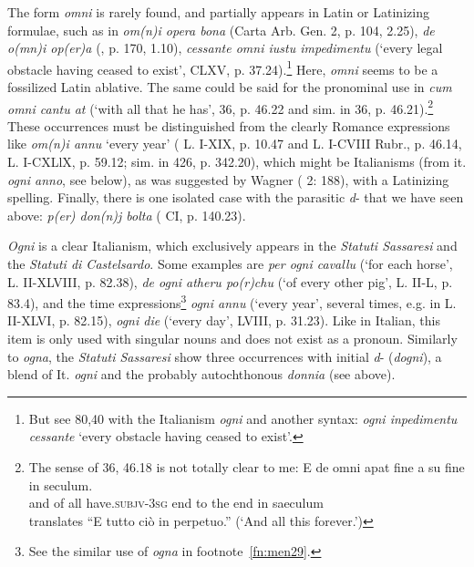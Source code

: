\documentclass[output=paper,colorlinks,citecolor=brown]{langscibook}
\begin{document}
The form \textit{omni} is rarely found, and partially appears in Latin or Latinizing formulae, such as in \textit{om(n)i opera bona} (Carta Arb. Gen. 2, p. 104, 2.25), \textit{de o(mn)i op(er)a} (, p. 170, 1.10), \textit{cessante omni iustu impedimentu} (‘every legal obstacle having ceased to exist’,  CLXV, p. 37.24).\footnote{But see  80,40 with the Italianism \textit{ogni} and another syntax: \textit{ogni inpedimentu cessante} ‘every obstacle having ceased to exist’.} Here, \textit{omni} seems to be a fossilized Latin ablative. The same could be said for the pronominal use in \textit{cum omni cantu at} (‘with all that he has’,   36, p. 46.22 and sim. in  36, p. 46.21).\footnote{The sense of  36, 46.18 is not totally clear to me:
\ea
    \gll E de omni apat fine a su fine in seculum.\\
    and	of	all	have.\textsc{subjv-3sg} end	to	the	end	in saeculum\\\z
\citet[][113]{Virdis2003} translates “E tutto ciò in perpetuo.” (‘And all this forever.’)} These occurrences must be distinguished from the clearly Romance expressions like \textit{om(n)i annu} ‘every year’ ( L. I-XIX, p. 10.47 and   L. I-CVIII Rubr., p. 46.14,  L. I-CXLlX, p. 59.12; sim. in  426, p. 342.20), which might be Italianisms (from it. \textit{ogni anno}, see below), as was suggested by Wagner ( 2: 188), with a Latinizing spelling. Finally, there is one isolated case with the parasitic \textit{d}- that we have seen above: \textit{p(er) don(n)j bolta} ( CI, p. 140.23).

\textit{Ogni} is a clear Italianism, which exclusively appears in the \textit{Statuti Sassaresi} and the \textit{Statuti di Castelsardo}. Some examples are \textit{per ogni cavallu} (‘for each horse’,  L. II-XLVIII, p. 82.38), \textit{de ogni atheru po(r)chu} (‘of every other pig’,  L. II-L, p. 83.4),  and the time expressions\footnote{See the similar use of \textit{ogna} in footnote~\ref{fn:men29}.} \textit{ogni annu} (‘every year’, several times, e.g. in  L. II-XLVI, p. 82.15), \textit{ogni die} (‘every day’,  LVIII, p. 31.23). Like in Italian, this item is only used with singular nouns and does not exist as a pronoun. Similarly to \textit{ogna}, the \textit{Statuti Sassaresi} show three occurrences with initial \textit{d}- (\textit{dogni}), a blend of It. \textit{ogni} and the probably autochthonous \textit{donnia} (see above).
\end{document}
